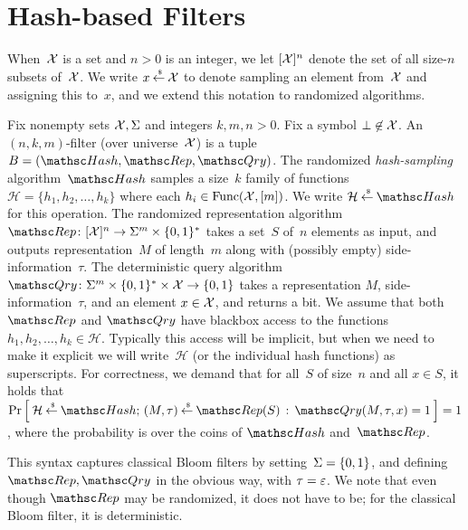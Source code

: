 \section{Hash-based Filters}
When~${\cal X}$ is a set and $n>0$ is an integer, we let $[{\cal X}]^n$ denote the set of all size-$n$ subsets of~${\cal X}$. We write $x {\:\stackrel{{\scriptscriptstyle \hspace{0.2em}\$}} {\leftarrow}\:} {\cal X}$ to denote sampling an element from~${\cal X}$ and assigning this to~$x$, and we extend this notation to randomized algorithms.

Fix nonempty sets ${\cal X},\Sigma$ and integers $k,m,n>0$.  Fix a symbol $\bot \not\in {\cal X}$. An $(n,k,m)$-filter (over universe~${\cal X}$) is a tuple $B=(\Hash,\Rep,\Qry)$.
%
The randomized \emph{hash-sampling} algorithm~$\Hash$ samples a size~$k$ family of functions~$\mathcal{H}=\{h_1,h_2,\ldots,h_k\}$ where each $h_i \in \mathrm{Func}({\cal X},[m])$.  
We write $\mathcal{H} \getsr \Hash$ for this operation.
%
The randomized representation algorithm $\Rep\colon [\univ]^n \rightarrow \Sigma^m \times \bits^*$ takes a set~$S$ of~$n$ elements as input, and outputs representation~$M$ of length~$m$ along with (possibly empty) side-information~$\tau$.
%
The deterministic query algorithm $\Qry\colon \Sigma^m \times \bits^* \times \univ \rightarrow \bits$ takes a representation $M$, side-information~$\tau$, and an element $x \in {\cal X}$, and returns a bit.
%
We assume that both $\Rep$ and $\Qry$ have blackbox access to the functions $h_1,h_2,\ldots,h_k \in \mathcal{H}$.  Typically this access will be implicit, but when we need to make it explicit we will write~$\mathcal{H}$ (or the individual hash functions) as superscripts.
%
For correctness, we demand that for all~$S$ of size~$n$ and all $x \in S$, it holds that $\Prob{\mathcal{H}\getsr\Hash;\,(M,\tau)\getsr\Rep(S)\,:\,\Qry(M,\tau,x)=1}=1$, where the probability is over the coins of $\Hash$ and~$\Rep$.


This syntax captures classical Bloom filters by setting~$\Sigma=\{0,1\}$, and defining $\Rep,\Qry$ in the obvious way, with $\tau=\varepsilon$. We note that even though $\Rep$ may be randomized, it does not have to be; for the classical Bloom filter, it is deterministic.

